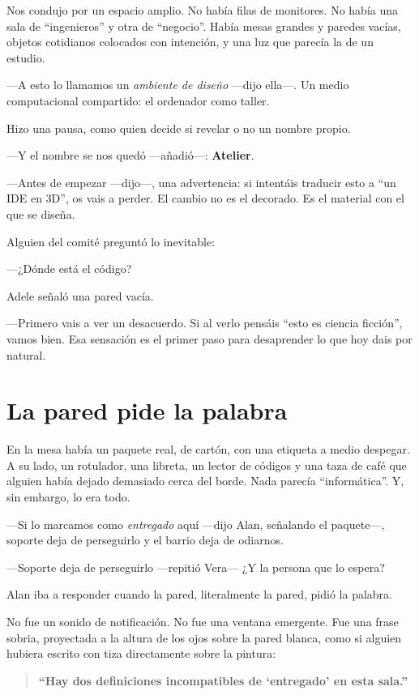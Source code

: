 \documentclass[11pt,a4paper]{article}
\begin{document}
Nos condujo por un espacio amplio. No había filas de monitores. No había una
sala de ``ingenieros'' y otra de ``negocio''. Había mesas grandes y paredes
vacías, objetos cotidianos colocados con intención, y una luz que parecía la
de un estudio.

---A esto lo llamamos un \emph{ambiente de diseño} ---dijo ella---. Un medio
computacional compartido: el ordenador como taller.

Hizo una pausa, como quien decide si revelar o no un nombre propio.

---Y el nombre se nos quedó ---añadió---: \textbf{Atelier}.

---Antes de empezar ---dijo---, una advertencia: si intentáis traducir esto a
``un IDE en 3D'', os vais a perder. El cambio no es el decorado. Es el
material con el que se diseña.

Alguien del comité preguntó lo inevitable:

---¿Dónde está el código?

Adele señaló una pared vacía.

---Primero vais a ver un desacuerdo. Si al verlo pensáis ``esto es ciencia
ficción'', vamos bien. Esa sensación es el primer paso para desaprender lo que
hoy dais por natural.

\section{La pared pide la palabra}

En la mesa había un paquete real, de cartón, con una etiqueta a medio
despegar. A su lado, un rotulador, una libreta, un lector de códigos y una
taza de café que alguien había dejado demasiado cerca del borde. Nada parecía
``informática''. Y, sin embargo, lo era todo.

---Si lo marcamos como \emph{entregado} aquí ---dijo Alan, señalando el
paquete---, soporte deja de perseguirlo y el barrio deja de odiarnos.

---Soporte deja de perseguirlo ---repitió Vera--- ¿Y la persona que lo espera?

Alan iba a responder cuando la pared, literalmente la pared, pidió la palabra.

No fue un sonido de notificación. No fue una ventana emergente. Fue una frase
sobria, proyectada a la altura de los ojos sobre la pared blanca, como si
alguien hubiera escrito con tiza directamente sobre la pintura:

\begin{quote}
\centering
\textbf{``Hay dos definiciones incompatibles de `entregado' en esta sala.''}
\end{quote}
\end{document}

